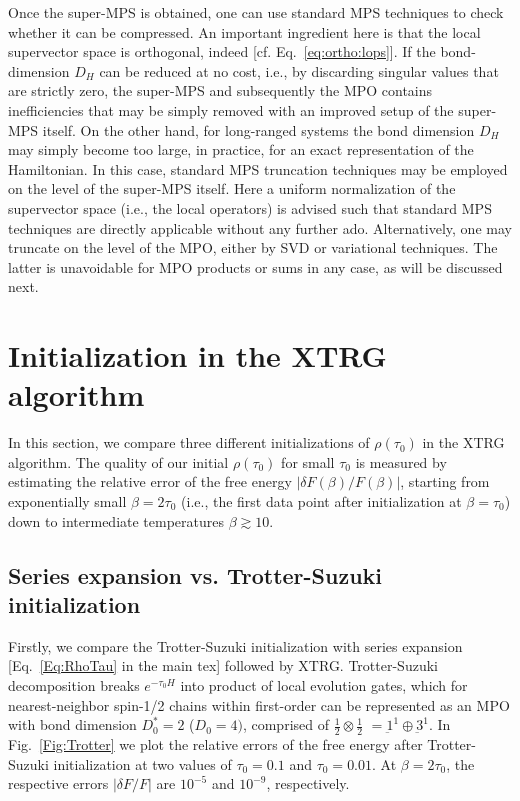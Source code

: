 \documentclass[aps,prx,twocolumn,showpacs,psfig,superscriptaddress,longbibliography]{revtex4-1}
\newcommand{\Eq}[1]{Eq.~\eqref{#1}}
\newcommand{\Fig}[1]{Fig.~\ref{#1}}
\def\Dstar{D^\ast}
\def\taui{\tau_0}
\def\Dstari{\Dstar_0}
\def\Di{D_0}
\begin{document}
Once the super-MPS is obtained, one can use standard MPS techniques
to check whether it can be compressed.  An important ingredient here
is that the local supervector space is orthogonal, indeed [cf.
\Eq{eq:ortho:lops}].  If the bond-dimension $D_H$ can be reduced at
no cost, i.e., by discarding singular values that are strictly zero,
the super-MPS and subsequently the MPO contains inefficiencies that
may be simply removed with an improved setup of the super-MPS
itself. On the other hand, for long-ranged systems the bond
dimension $D_H$ may simply become too large, in practice, for an
exact representation of the Hamiltonian. In this case, standard MPS
truncation techniques may be employed on the level of the super-MPS
itself. Here a uniform normalization of the supervector space (i.e.,
the local operators) is advised such that standard MPS techniques
are directly applicable without any further ado.  Alternatively, one
may truncate on the level of the MPO, either by SVD or variational
techniques. The latter is unavoidable for MPO products or sums in
any case, as will be discussed next.

\section{Initialization in the XTRG algorithm}
\label{App:Init}

In this section, we compare three different initializations of
$\rho(\taui)$ in the XTRG algorithm.  The quality of our initial
$\rho(\taui)$ for small $\taui$ is measured by estimating the
relative error of the free energy $|\delta F(\beta)/F(\beta)|$,
starting from exponentially small $\beta=2\taui$ (i.e., the first
data point after initialization at $\beta=\taui$) down to
intermediate temperatures $\beta \gtrsim 10$.

\subsection{Series expansion vs. Trotter-Suzuki initialization}

Firstly, we compare the Trotter-Suzuki initialization with series
expansion [\Eq{Eq:RhoTau} in the main tex] followed by XTRG.
Trotter-Suzuki decomposition breaks $e^{-\taui H}$ into product of
local evolution gates, which for nearest-neighbor spin-1/2 chains
within first-order can be represented as an MPO with bond dimension
$\Dstari=2$ ($\Di=4)$, comprised of $\tfrac{1}{2} \otimes
\tfrac{1}{2}$ $ = \underbar{1}^1 \oplus \underbar{3}^1$.  In
\Fig{Fig:Trotter} we plot the relative errors of the free energy
after Trotter-Suzuki initialization at two values of $\taui=0.1$ and
$\taui=0.01$.  At $\beta=2\taui$, the respective errors $|\delta
F/F|$ are $10^{-5}$ and $10^{-9}$, respectively.
\end{document}
